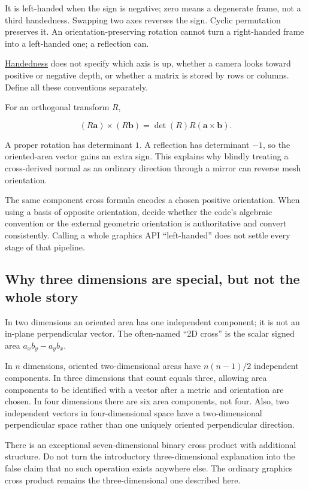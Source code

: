 It is left-handed when the sign is negative; zero means a degenerate frame, not a third handedness. Swapping two axes reverses the sign. Cyclic permutation preserves it. An orientation-preserving rotation cannot turn a right-handed frame into a left-handed one; a reflection can.

\hyperref[01-foundations-i-ch017-oriented-area-tells-us-which-side-of-the-panel-is-front]{Handedness} does not specify which axis is up, whether a camera looks toward positive or negative depth, or whether a matrix is stored by rows or columns. Define all these conventions separately.

For an orthogonal transform \(R\),

\[
(R\mathbf a)\times(R\mathbf b)
=\det(R)R(\mathbf a\times\mathbf b).
\]

A proper rotation has determinant \(1\). A reflection has determinant \(-1\), so the oriented-area vector gains an extra sign. This explains why blindly treating a cross-derived normal as an ordinary direction through a mirror can reverse mesh orientation.

The same component cross formula encodes a chosen positive orientation. When using a basis of opposite orientation, decide whether the code's algebraic convention or the external geometric orientation is authoritative and convert consistently. Calling a whole graphics API ``left-handed'' does not settle every stage of that pipeline.

\subsection{Why three dimensions are special, but not the whole story}\label{01-foundations-i-ch017-why-three-dimensions-are-special-but-not-the-whole-story}

In two dimensions an oriented area has one independent component; it is not an in-plane perpendicular vector. The often-named ``2D cross'' is the scalar signed area \(a_xb_y-a_yb_x\).

In \(n\) dimensions, oriented two-dimensional areas have \(n(n-1)/2\) independent components. In three dimensions that count equals three, allowing area components to be identified with a vector after a metric and orientation are chosen. In four dimensions there are six area components, not four. Also, two independent vectors in four-dimensional space have a two-dimensional perpendicular space rather than one uniquely oriented perpendicular direction.

There is an exceptional seven-dimensional binary cross product with additional structure. Do not turn the introductory three-dimensional explanation into the false claim that no such operation exists anywhere else. The ordinary graphics cross product remains the three-dimensional one described here.

